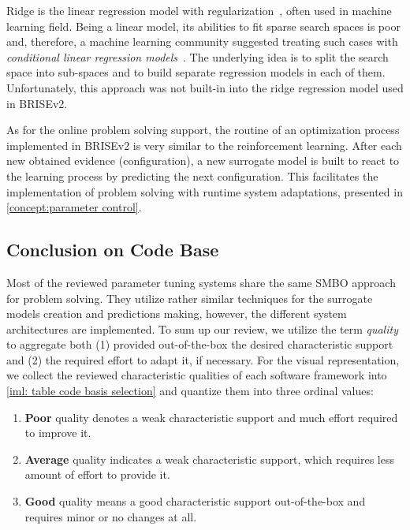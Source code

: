 Ridge is the linear regression model with regularization~\cite{hoerl1970ridge}, often used in machine learning field. Being a linear model, its abilities to fit sparse search spaces is poor and, therefore, a machine learning community suggested treating such cases with \emph{conditional linear regression models}~\cite{DBLP:journals/corr/abs-1806-02326}. The underlying idea is to split the search space into sub-spaces and to build separate regression models in each of them. Unfortunately, this approach was not built-in into the ridge regression model used in BRISEv2.

As for the online problem solving support, the routine of an optimization process implemented in BRISEv2 is very similar to the reinforcement learning. After each new obtained evidence (configuration), a new surrogate model is built to react to the learning process by predicting the next configuration. This facilitates the implementation of problem solving with runtime system adaptations, presented in \cref{concept:parameter control}.

\subsection{Conclusion on Code Base}\label{impl:hlh code basis conclusion}
Most of the reviewed parameter tuning systems share the same SMBO approach for problem solving. They utilize rather similar techniques for the surrogate models creation and predictions making, however, the different system architectures are implemented. To sum up our review, we utilize the term \emph{quality} to aggregate both (1) provided out-of-the-box the desired characteristic support and (2) the required effort to adapt it, if necessary. For the visual representation, we collect the reviewed characteristic qualities of each software framework into \cref{iml: table code basis selection} and quantize them into three ordinal values:
\begin{enumerate}
	\item \textbf{Poor} quality denotes a weak characteristic support and much effort required to improve it.
	\item \textbf{Average} quality indicates a weak characteristic support, which requires less amount of effort to provide it.
	\item \textbf{Good} quality means a good characteristic support out-of-the-box and requires minor or no changes at all.
\end{enumerate}

